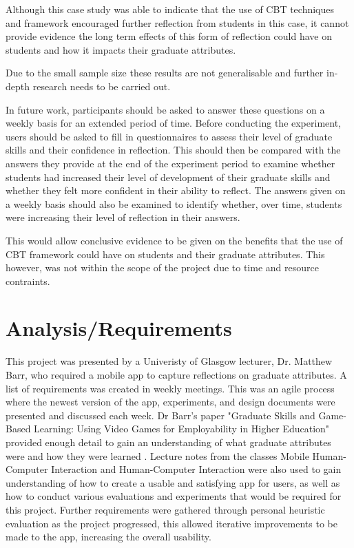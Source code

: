 \documentclass{l4proj}
\begin{document}
Although this case study was able to indicate that the use of CBT techniques and framework encouraged further reflection from students in this case, it cannot provide evidence the long term effects of this form of reflection could have on students and how it impacts their graduate attributes. 

Due to the small sample size these results are not generalisable and further in-depth research needs to be carried out. 

In future work, participants should be asked to answer these questions on a weekly basis for an extended period of time. Before conducting the experiment, users should be asked to fill in questionnaires to assess their level of graduate skills and their confidence in reflection. This should then be compared with the answers they provide at the end of the experiment period to examine whether students had increased their level of development of their graduate skills and whether they felt more confident in their ability to reflect. The answers given on a weekly basis should also be examined to identify whether, over time, students were increasing their level of reflection in their answers. 

This would allow conclusive evidence to be given on the benefits that the use of CBT framework could have on students and their graduate attributes. This however, was not within the scope of the project due to time and resource contraints. 



\chapter{Analysis/Requirements} \label{analysis/reqs}

This project was presented by a Univeristy of Glasgow lecturer, Dr. Matthew Barr, who required a mobile app to capture reflections on graduate attributes. A list of requirements was created in weekly meetings. This was an agile process where the newest version of the app, experiments, and design documents were presented and discussed each week. Dr Barr's paper "Graduate Skills and Game-Based Learning: Using Video Games for Employability in Higher Education" provided enough detail to gain an understanding of what graduate attributes were and how they were learned \citep{barr_2019}. Lecture notes from the classes Mobile Human-Computer Interaction and Human-Computer Interaction were also used to gain understanding of how to create a usable and satisfying app for users, as well as how to conduct various evaluations and experiments that would be required for this project. Further requirements were gathered through personal heuristic evaluation as the project progressed, this allowed iterative improvements to be made to the app, increasing the overall usability.
\end{document}
